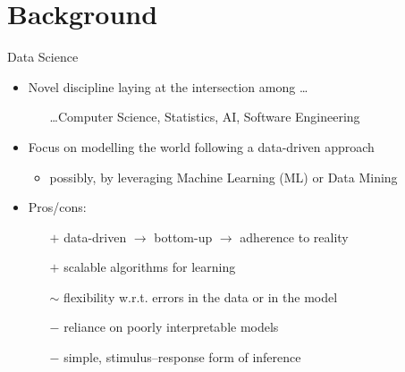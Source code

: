 \documentclass[presentation]{beamer}\mode<presentation>{\usetheme{AMSBolognaFC}}
\begin{document}
\section{Background}


\begin{frame}{Data Science}
    \begin{itemize}
        \item Novel discipline laying at the intersection among \ldots
        \begin{itemize}
            \item[] \ldots Computer Science, Statistics, AI, Software Engineering
        \end{itemize}
        
        \vfill 
        
        \item Focus on modelling the world following a \alert{data-driven} approach
        \begin{itemize}
            \item possibly, by leveraging \alert{Machine Learning} (ML) or Data Mining
        \end{itemize}
        
        \vfill

        \item Pros/cons:
        \begin{itemize}
            \item[$+$] data-driven $\rightarrow$ \alert{bottom-up} $\rightarrow$ adherence to reality
            \item[$+$] \alert{scalable} algorithms for learning
            \item[$\sim$] \alert{flexibility} w.r.t. errors in the data or in the model
            \item[$-$] reliance on \alert{poorly interpretable} models
            \item[$-$] simple, \alert{stimulus--response} form of inference
        \end{itemize}
    \end{itemize}
\end{frame}
\end{document}
